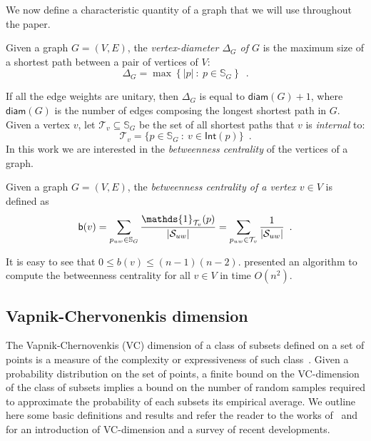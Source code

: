 We now define a characteristic quantity of a graph that we will use throughout
the paper.
\begin{definition}\label{def:vertexdiam}
  Given a graph $G=(V,E)$, the \emph{vertex-diameter $\Delta_G$ of $G$} is the
  maximum size of a shortest path between a pair of vertices of $V$:
  \[
  \Delta_G = \max\left\{|p| ~:~ p\in \mathbb{S}_G\right\}\enspace.\]
\end{definition}
If all the edge weights are unitary, then $\Delta_G$ is equal to
$\mathsf{diam}(G)+1$, where $\mathsf{diam}(G)$ is the number of edges composing the
longest shortest path in $G$.
Given a vertex $v$, let $\mathcal{T}_v\subseteq\mathbb{S}_G$ be the set of all
shortest paths that $v$ is \emph{internal} to:
\[
\mathcal{T}_v=\{p\in\mathbb{S}_G ~:~ v\in\mathsf{Int}(p)\}\enspace.
\]
In this work we are interested in the \emph{betweenness centrality} of the
vertices of a graph.
\begin{definition}\label{def:betwenness}
  Given a graph $G=(V,E)$, the \emph{betweenness centrality of a vertex $v\in
  V$} is defined as
  \[
  \betw(v)=\sum_{p_{uw}\in\mathbb{S}_G}\frac{\mathds{1}_{\mathcal{T}_v}(p)}{|\mathcal{S}_{uw}|}=\sum_{p_{uw}\in\mathcal{T}_v}\frac{1}{|\mathcal{S}_{uw}|}\enspace.
  \]
\end{definition} 

It is easy to see that $0\le b(v)\le (n-1)(n-2)$. \citet{Brandes01} presented an
algorithm to compute the betweenness centrality for all $v\in V$ in time
$O(n^2)$. 

\subsection{Vapnik-Chervonenkis dimension}\label{sec:prelvcdim}
The Vapnik-Chernovenkis (VC) dimension of a class of subsets defined
on a set of points is a measure of the complexity or expressiveness of such
class~\citep{VapnikC71}. Given a probability distribution on the set of points,
a finite bound on the VC-dimension of the class of subsets implies a bound on
the number of random samples required to approximate the probability of each
subsets its empirical average. We outline here some basic definitions and
results and refer the reader to the works of~\citet[Sect.~14.4]{AlonS08} and
\citet[Sect.~3]{BoucheronBL05} for an introduction of VC-dimension and a survey
of recent developments. 

